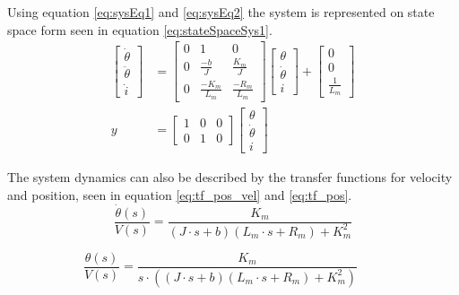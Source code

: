 \documentclass[../../main.tex]{subfiles}
\begin{document}
Using equation \ref{eq:sysEq1} and \ref{eq:sysEq2} the system is represented on state space form seen in equation \ref{eq:stateSpaceSys1}.
\begin{equation}\label{eq:stateSpaceSys1}
\begin{split}
\begin{bmatrix}
\dot{\theta}\\
\ddot{\theta}\\
\dot{i}
\end{bmatrix} &=
\begin{bmatrix}
0 & 1 & 0 \\
0 & \frac{-b}{J} & \frac{K_m}{J}\\
0 & \frac{-K_m}{L_m} & \frac{-R_m}{L_m}
\end{bmatrix}
\begin{bmatrix}
\theta\\
\dot{\theta}\\
i
\end{bmatrix}
+ 
\begin{bmatrix}
0 \\
0 \\
\frac{1}{L_m}
\end{bmatrix} \\
    y &= 
    \begin{bmatrix}
    1 & 0 & 0\\
    0 & 1 & 0
    \end{bmatrix}
    \begin{bmatrix}
    \theta\\
    \dot{\theta}\\
    i
    \end{bmatrix}
    \end{split}
\end{equation}

The system dynamics can also be described by the transfer functions for velocity and position, seen in equation \ref{eq:tf_pos_vel} and \ref{eq:tf_pos}.
\begin{equation}\label{eq:tf_pos}
    \frac{\dot{\theta}(s)}{V(s)} = \frac{K_m}{(J\cdot s + b)(L_m\cdot s + R_m) + K_m^2}
\end{equation}

\begin{equation}\label{eq:tf_pos_vel}
    \frac{\theta(s)}{V(s)} = \frac{K_m}{s\cdot((J\cdot s + b)(L_m\cdot s + R_m) + K_m^2)} \qquad 
\end{equation}
\end{document}
